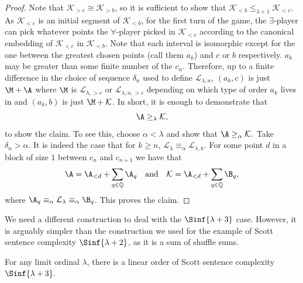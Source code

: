 \documentclass{amsart}
\newcommand{\Q}{\mathbb{Q}}
\newcommand{\K}{\mathcal{K}}
\renewcommand{\L}{\mathcal{L}}
\begin{document}
\begin{proof}
Note that $\K_{>c}\cong \K_{>b}$, so it is sufficient to show that
$\K_{<b}\leq_{\lambda+1} \K_{<c}.$
As $\K_{<c}$ is an initial segment of $\K_{<b}$, for the first turn of the game,
the $\exists$-player can pick whatever points the $\forall$-player picked in
$\K_{<c}$ according to the canonical embedding of $\K_{<c}$ in $\K_{<b}$.
Note that each interval is isomorphic except for the one between the greatest chosen points (call them $a_k$) and $c$ or $b$ respectively. 
$a_k$ may be greater than some finite number of the $c_n$. 
Therefore, up to a finite difference in the choice of sequence $\delta_n$ used
to define $\L_{\lambda,n}$, $(a_k,c)$ is just $\M+\A$ where $\M$ is
$\L_{\lambda,>c}$ or $\L_{\lambda,n,>c}$ depending on which type of order $a_k$
lives in and $(a_k,b)$ is just $\M+\K$.
In short, it is enough to demonstrate that
$$\A\geq_\lambda \K,$$
to show the claim.
To see this, choose $\alpha<\lambda$ and show that
$\A\geq_\alpha \K.$
Take $\delta_n>\alpha$. It is indeed the case that for $k\geq n$,
$\L_{\lambda}\equiv_\alpha \L_{\lambda,k}$. For some point $d$ in a block of
size $1$ between $c_n$ and $c_{n+1}$ we have that
\[\A=\A_{<d}+\sum_{q\in\Q} \A_q~~ \text{ and } ~~ \K=\A_{<d}+\sum_{q\in\Q} \B_q,\]
where $\A_q\equiv_\alpha \L_{\lambda}\equiv_\alpha \B_q$. This proves the claim.
\end{proof}

We need a different construction to deal with the $\Sinf{\lambda+3}$ case. 
However, it is arguably simpler than the construction we used for the example of
Scott sentence complexity $\Sinf{\lambda+2}$, as it is a sum of shuffle sums.
\begin{theorem}\label{thm:Slim+3}
For any limit ordinal $\lambda$, there is a linear order of Scott sentence
complexity $\Sinf{\lambda+3}.$
\end{theorem}
\end{document}
